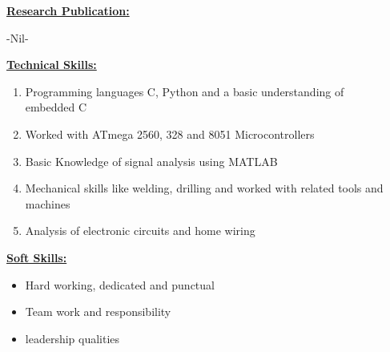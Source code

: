 \documentclass[10pt]{article}
\begin{document}
	\hfill 
	
	\underline{\textbf{\Large{Research Publication:}}}
	\begin{enumerate}
		-Nil-
	\end{enumerate}

	\hfill
	
	\underline{\textbf{\Large{Technical Skills:}}}
	\begin{enumerate}
		\item{Programming languages C, Python and a basic understanding of \\embedded C}
		\item{Worked with ATmega 2560, 328 and 8051 Microcontrollers}
		\item {Basic Knowledge of signal analysis using MATLAB}
		\item{Mechanical skills like welding, drilling and worked with related tools and machines}
		\item{Analysis of electronic circuits and home wiring}
	\end{enumerate}
	
	\vspace{3cm}
	\hfill 
	\hfill
	
	\underline{\textbf{\Large{Soft Skills:}}}
	\begin{itemize}
		\item{Hard working, dedicated and punctual}
		\item{Team work and responsibility}
		\item{leadership qualities}\\ 
	\end{itemize}
	\vspace{1cm}
	\hfill
	
\end{document}
